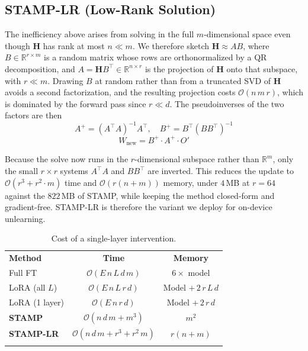 \subsection{STAMP-LR (Low-Rank Solution)}
The inefficiency above arises from solving in the full $m$-dimensional space even though $\mathbf{H}$ has rank at most $n \ll m$. We therefore sketch $\mathbf{H} \approx A B$, where $B \in \mathbb{R}^{r \times m}$ is a random matrix whose rows are orthonormalized by a QR decomposition, and $A = \mathbf{H} B^{\top} \in \mathbb{R}^{n \times r}$ is the projection of $\mathbf{H}$ onto that subspace, with $r \ll m$. Drawing $B$ at random rather than from a truncated SVD of $\mathbf{H}$ avoids a second factorization, and the resulting projection costs $\mathcal{O}(n\,m\,r)$, which is dominated by the forward pass since $r \ll d$. The pseudoinverses of the two factors are then
\begin{equation}
A^{+} = (A^\top A)^{-1} A^\top, \quad
B^{+} = B^\top (B B^\top)^{-1}
\end{equation}
\begin{equation}
W_{\mathrm{new}} = B^{+} \cdot A^{+} \cdot O'
\end{equation}

Because the solve now runs in the $r$-dimensional subspace rather than $\mathbb{R}^{m}$, only the small $r \times r$ systems $A^{\top}A$ and $BB^{\top}$ are inverted. This reduces the update to $\mathcal{O}(r^3 + r^2 \cdot m)$ time and $\mathcal{O}(r(n + m))$ memory, under $4$\,MB at $r = 64$ against the $822$\,MB of STAMP, while keeping the method closed-form and gradient-free. STAMP-LR is therefore the variant we deploy for on-device unlearning.

\begin{table}[t]
\centering
\caption{Cost of a single-layer intervention.}
\label{tab:cost_comparison}
\small
\renewcommand{\arraystretch}{1.25}
\begin{tabular}{l|cc}
\Xhline{1.15pt}
\textbf{Method} & \textbf{Time} & \textbf{Memory} \\
\Xhline{1.15pt}
Full FT & $\mathcal{O}(E\,n\,L\,d\,m)$ & $6\times$ model \\
\rowcolor{gray!15}
LoRA (all $L$) & $\mathcal{O}(E\,n\,L\,r\,d)$ & Model $+\,2\,r\,L\,d$ \\
LoRA (1 layer) & $\mathcal{O}(E\,n\,r\,d)$ & Model $+\,2\,r\,d$ \\
\rowcolor{gray!15}
\textbf{STAMP} & $\mathcal{O}(n\,d\,m + m^{3})$ & $m^{2}$ \\
\textbf{STAMP-LR} & $\mathcal{O}(n\,d\,m + r^{3} + r^{2}\,m)$ & $r(n + m)$ \\
\Xhline{1.15pt}
\end{tabular}
\end{table}

